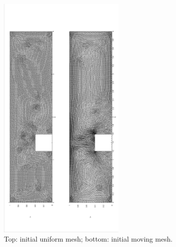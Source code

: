       \begin{figure}[!htbp]
        \begin{center}
        \includegraphics[width = 0.55\textwidth, angle = -90]{picture/first/step_flow_data/initial_mesh40_001.eps}
        \caption{\small Top: initial uniform mesh; bottom: initial moving mesh.}
        \label{fig::step_initial_mesh}
        \end{center}
      \end{figure}

